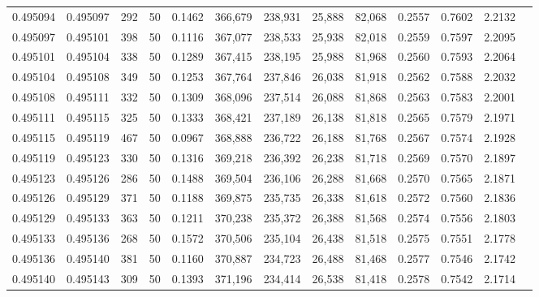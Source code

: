 \begin{tabular}{rrrrrrrrrrrrr}
0.495094 & 0.495097 &   292 &  50 &                                     0.1462 & 366,679 & 238,931 &  25,888 &  82,068 & 0.2557 & 0.7602 & 2.2132 \\
0.495097 & 0.495101 &   398 &  50 &                                     0.1116 & 367,077 & 238,533 &  25,938 &  82,018 & 0.2559 & 0.7597 & 2.2095 \\
0.495101 & 0.495104 &   338 &  50 &                                     0.1289 & 367,415 & 238,195 &  25,988 &  81,968 & 0.2560 & 0.7593 & 2.2064 \\
0.495104 & 0.495108 &   349 &  50 &                                     0.1253 & 367,764 & 237,846 &  26,038 &  81,918 & 0.2562 & 0.7588 & 2.2032 \\
0.495108 & 0.495111 &   332 &  50 &                                     0.1309 & 368,096 & 237,514 &  26,088 &  81,868 & 0.2563 & 0.7583 & 2.2001 \\
0.495111 & 0.495115 &   325 &  50 &                                     0.1333 & 368,421 & 237,189 &  26,138 &  81,818 & 0.2565 & 0.7579 & 2.1971 \\
0.495115 & 0.495119 &   467 &  50 &                                     0.0967 & 368,888 & 236,722 &  26,188 &  81,768 & 0.2567 & 0.7574 & 2.1928 \\
0.495119 & 0.495123 &   330 &  50 &                                     0.1316 & 369,218 & 236,392 &  26,238 &  81,718 & 0.2569 & 0.7570 & 2.1897 \\
0.495123 & 0.495126 &   286 &  50 &                                     0.1488 & 369,504 & 236,106 &  26,288 &  81,668 & 0.2570 & 0.7565 & 2.1871 \\
0.495126 & 0.495129 &   371 &  50 &                                     0.1188 & 369,875 & 235,735 &  26,338 &  81,618 & 0.2572 & 0.7560 & 2.1836 \\
0.495129 & 0.495133 &   363 &  50 &                                     0.1211 & 370,238 & 235,372 &  26,388 &  81,568 & 0.2574 & 0.7556 & 2.1803 \\
0.495133 & 0.495136 &   268 &  50 &                                     0.1572 & 370,506 & 235,104 &  26,438 &  81,518 & 0.2575 & 0.7551 & 2.1778 \\
0.495136 & 0.495140 &   381 &  50 &                                     0.1160 & 370,887 & 234,723 &  26,488 &  81,468 & 0.2577 & 0.7546 & 2.1742 \\
0.495140 & 0.495143 &   309 &  50 &                                     0.1393 & 371,196 & 234,414 &  26,538 &  81,418 & 0.2578 & 0.7542 & 2.1714 \\

\end{tabular}
